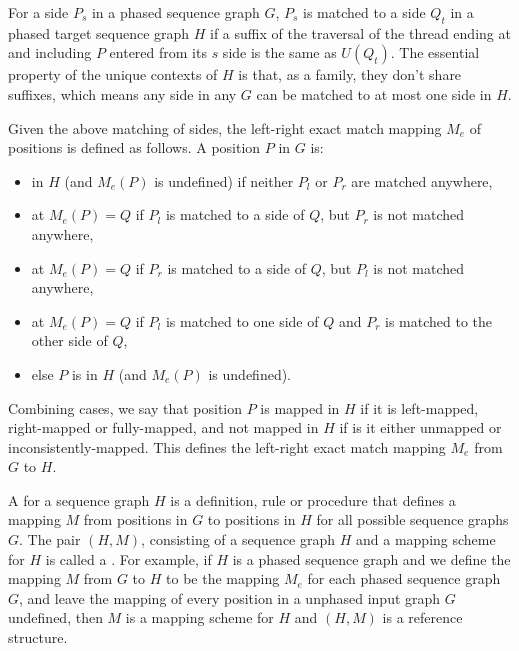 \documentclass[11pt,proposal]{ucthesis}
\begin{document}
For a side $P_s$ in a phased sequence graph $G$, $P_s$ is matched to a side $Q_t$ in a phased target sequence graph $H$ if a suffix of the traversal of the thread ending at and including $P$ entered from its $s$ side is the same as $U(Q_t)$. The essential property of the unique contexts of $H$ is that, as a family, they don't share suffixes, which means any side in any $G$ can be matched to at most one side in $H$. 

Given the above matching of sides, the left-right exact match mapping $M_e$ of positions is defined as follows. A position $P$ in $G$ is:
\begin{itemize}
\item {} in $H$ (and $M_e(P)$ is undefined) if neither $P_l$ or $P_r$ are matched anywhere, 
\item {} at $M_e(P) = Q$ if $P_l$ is matched to a side of $Q$, but $P_r$ is not matched anywhere, 
\item {} at $M_e(P) = Q$ if $P_r$ is matched to a side of $Q$, but $P_l$ is not matched anywhere,
\item {} at $M_e(P) = Q$ if $P_l$ is matched to one side of $Q$ and $P_r$ is matched to the other side of $Q$,
\item else $P$ is  in $H$ (and $M_e(P)$ is undefined).
\end{itemize}

Combining cases, we say that position $P$ is mapped in $H$ if it is left-mapped, right-mapped or fully-mapped, and not mapped in $H$ if is it either unmapped or inconsistently-mapped. This defines the left-right exact match mapping $M_e$ from $G$ to $H$. 

A  for a sequence graph $H$ is a definition, rule or procedure that defines a mapping $M$ from positions in $G$ to positions in $H$ for all possible sequence graphs $G$. The pair $(H, M)$, consisting of a sequence graph $H$ and a mapping scheme for $H$ is called a . For example, if $H$ is a phased sequence graph and we define the mapping $M$ from $G$ to $H$ to be the mapping $M_e$ for each phased sequence graph $G$, and leave the mapping of every position in a unphased input graph $G$ undefined, then $M$ is a mapping scheme for $H$ and $(H, M)$ is a reference structure. 
\end{document}
